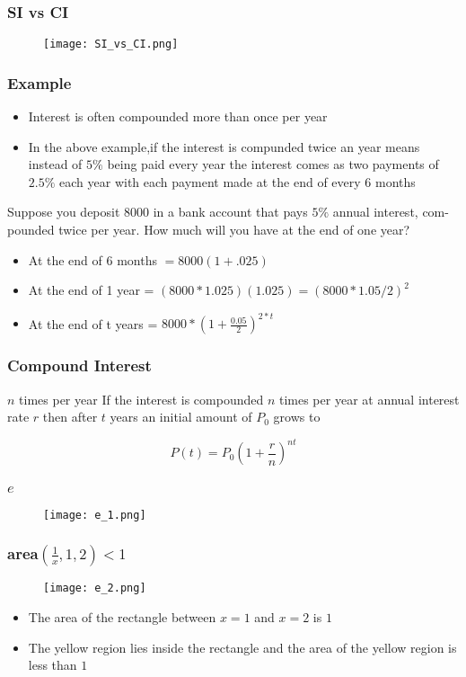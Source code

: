     \begin{frame}
      \frametitle{SI vs CI}
      \begin{figure}
        \texttt{[image: SI\_vs\_CI.png]}
      \end{figure}
    \end{frame}

    \begin{frame}
      \frametitle{Example}
\begin{itemize}
  \item Interest is often compounded more than once per year 
  \item In the above example,if the interest is compunded twice an year means instead of \(5\%\) being paid every year the interest comes as two payments of \(2.5\%\) each year with each payment made at the end of every 6 months
\end{itemize}
Suppose you deposit \(8000\) in a bank account that pays \(5\%\) annual interest, com-
pounded twice per year. How much will you have at the end of one year?

\pause 

\begin{itemize}
  \item At the end of 6 months \(= 8000(1+.025) \) 
  \item At the end of 1 year = \( (8000*1.025)(1.025) = (8000*1.05/2)^2 \)
  \item At the end of t years = \(8000*(1+\frac{0.05}{2})^{2*t} \)
\end{itemize}
\end{frame}
\begin{frame}
  \frametitle{Compound Interest}
  \begin{block}{\(n\) times per year}
    If the interest is compounded \(n\) times per year at annual interest rate
    \(r\) then after \(t\) years an initial amount of \(P_{0}\) grows to 

    \[P(t) = P_{0}(1+\frac{r}{n})^{nt}\]
    
  \end{block}
\end{frame}

\begin{frame}
  \frametitle{\( e \)}
  \begin{figure}
    \texttt{[image: e\_1.png]}
  \end{figure}
\end{frame}

\begin{frame}
  \frametitle{area\((\frac{1}{x},1,2) < 1 \) }
  \begin{figure}
    \texttt{[image: e\_2.png]}
  \end{figure}
  \begin{itemize}
    \item The area of the rectangle between \(x=1\) and \(x=2\) is \(1\) 
    \item The yellow region lies inside the rectangle and the area of the yellow region is less than \(1\) 
  \end{itemize}
\end{frame}



